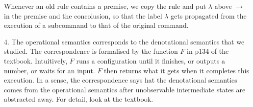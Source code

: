 \documentclass{report}[12pt]
\begin{document}
{\vspace{1cm}

\begin{prooftree}
\end{prooftree}

\vspace{1cm}

\begin{prooftree}
\end{prooftree}
\par}
Whenever an old rule contains a premise, we copy the rule and put $\lambda$ above $\rightarrow$ in the premise and the concolusion, so that the label $\lambda$ gets propagated from the execution of a subcommand to that of the original command.

4. The operational semantics corresponds to the denotational semantics that we studied. The correspondence is formalised by the function $F$ in p134 of the textbook. Intuitively, $F$ runs a configuration until it finishes, or outputs a number, or waits for an input. $F$ then returns what it gets when it completes this execution. In a sense, the correspondence says hat the denotational semantics comes from the operational semantics after unobservable intermediate states are abstracted away. For detail, look at the textbook.
\end{document}
